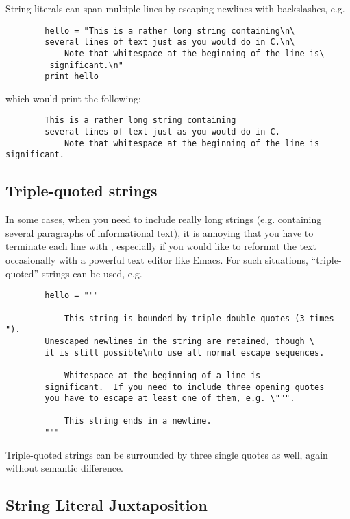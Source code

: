 String literals can span multiple lines by escaping newlines with
backslashes, e.g.

\begin{verbatim}
        hello = "This is a rather long string containing\n\
        several lines of text just as you would do in C.\n\
            Note that whitespace at the beginning of the line is\
         significant.\n"
        print hello
\end{verbatim}

which would print the following:
\begin{verbatim}
        This is a rather long string containing
        several lines of text just as you would do in C.
            Note that whitespace at the beginning of the line is significant.
\end{verbatim}

\subsection{Triple-quoted strings}

In some cases, when you need to include really long strings (e.g.
containing several paragraphs of informational text), it is annoying
that you have to terminate each line with \verb@\n\@, especially if
you would like to reformat the text occasionally with a powerful text
editor like Emacs.  For such situations, ``triple-quoted'' strings can
be used, e.g.

\begin{verbatim}
        hello = """

            This string is bounded by triple double quotes (3 times ").
        Unescaped newlines in the string are retained, though \
        it is still possible\nto use all normal escape sequences.

            Whitespace at the beginning of a line is
        significant.  If you need to include three opening quotes
        you have to escape at least one of them, e.g. \""".

            This string ends in a newline.
        """
\end{verbatim}

Triple-quoted strings can be surrounded by three single quotes as
well, again without semantic difference.

\subsection{String Literal Juxtaposition}

